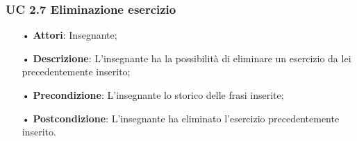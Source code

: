  
\subsubsection{UC 2.7 Eliminazione esercizio}
\begin{itemize}
	\item[•] \textbf{Attori}: Insegnante;
	\item[•] \textbf{Descrizione}: L'insegnante ha la possibilità di eliminare un esercizio da lei precedentemente inserito;
	\item[•] \textbf{Precondizione}: L'insegnante lo storico delle frasi inserite;
	\item[•] \textbf{Postcondizione}: L'insegnante ha eliminato l'esercizio precedentemente inserito.
\end{itemize}
